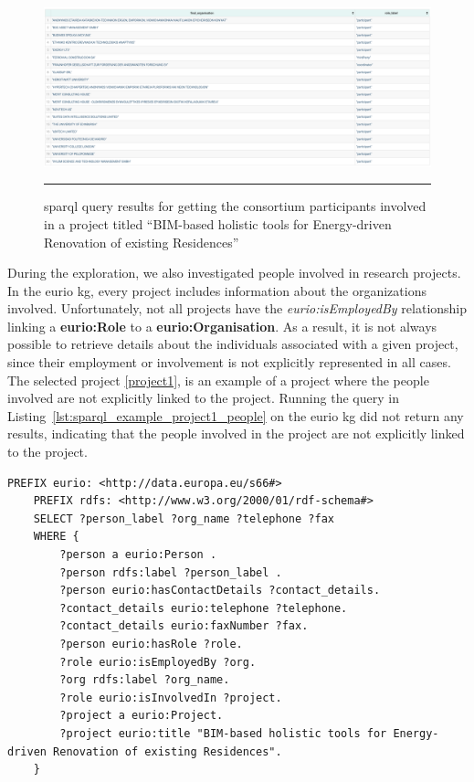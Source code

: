 \begin{figure}[htbp]
    \centering
 \includegraphics[width=.8\textwidth]{figures/architecture/sparql_example_project1_consortium_participants.png}
     \rule{35em}{0.5pt}
    \caption{\gls{sparql} query results for getting the consortium participants involved in a project titled ``BIM-based holistic tools for Energy-driven Renovation of existing Residences''}
 \label{fig:sparql_example_project1_consortium_participants}
\end{figure}

During the exploration, we also investigated people involved in research projects.
In the \gls{eurio} \gls{kg}, every project includes information about the organizations involved.
Unfortunately, not all projects have the \textit{eurio:isEmployedBy} relationship linking a \textbf{eurio:Role} to a \textbf{eurio:Organisation}.
As a result, it is not always possible to retrieve details about the individuals associated with a given project, since their employment or involvement is not explicitly represented in all cases.
The selected project \ref{project1}, is an example of a project where the people involved are not explicitly linked to the project.
Running the query in Listing~\ref{lst:sparql_example_project1_people} on the \gls{eurio} \gls{kg} did not return any results, indicating that the people involved in the project are not explicitly linked to the project.

\begin{lstlisting}[language=SPARQL, caption={\gls{sparql} query for getting full name, organisation, telephone, and fax of the people involved in a project titled ``BIM-based holistic tools for Energy-driven Renovation of existing Residences''}, label=lst:sparql_example_project1_people]
    PREFIX eurio: <http://data.europa.eu/s66#>
    PREFIX rdfs: <http://www.w3.org/2000/01/rdf-schema#>
    SELECT ?person_label ?org_name ?telephone ?fax
    WHERE {
        ?person a eurio:Person .
        ?person rdfs:label ?person_label .
        ?person eurio:hasContactDetails ?contact_details.
        ?contact_details eurio:telephone ?telephone.
        ?contact_details eurio:faxNumber ?fax.
        ?person eurio:hasRole ?role.
        ?role eurio:isEmployedBy ?org.
        ?org rdfs:label ?org_name.
        ?role eurio:isInvolvedIn ?project.
        ?project a eurio:Project.
        ?project eurio:title "BIM-based holistic tools for Energy-driven Renovation of existing Residences".
    }
\end{lstlisting}

